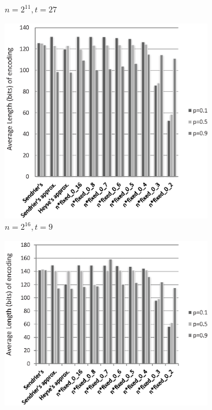 \documentclass[10pt,journal,compsoc]{IEEEtran}
\begin{document}
\begin{figure}[!htb]
\begin{subfigure}{.42\textwidth}
\caption{$n=2^{11},t=27$}
\end{subfigure}
\hfill
\begin{subfigure}{.42\textwidth}\centering
\includegraphics[width=\textwidth,height=.27\textheight]{./fig/best_d-16-9.eps}
\caption{$n=2^{16},t=9$}
\end{subfigure}
\hfill
\begin{subfigure}{.42\textwidth}\centering
\includegraphics[width=\textwidth,height=.27\textheight]{./fig/best_d-18-9.eps}

\end{subfigure}
\end{figure}
\end{document}
